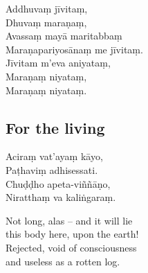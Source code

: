 

Addhuvaṃ jīvitaṃ,\\
Dhuvaṃ maraṇaṃ,\\
Avassaṃ mayā maritabbaṃ\\
Maraṇapariyosānaṃ me jīvitaṃ.\\
Jīvitam m'eva aniyataṃ,\\
Maraṇaṃ niyataṃ,\\
Maraṇaṃ niyataṃ.



\subsection{For the living}


Aciraṃ vat'ayaṃ kāyo,\\
Paṭhaviṃ adhisessati.\\
Chuḍḍho apeta-viññāṇo,\\
Niratthaṃ va kaliṅgaraṃ.

\begin{english}
  Not long, alas -- and it will lie\\
  this body here, upon the earth!\\
  Rejected, void of consciousness\\
  and useless as a rotten log.
\end{english}



